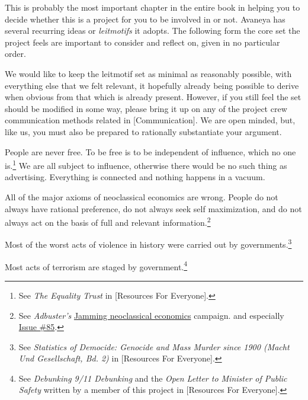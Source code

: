 

This is probably the most important chapter in the entire book in helping you to decide whether this is a project for you to be involved in or not. Avaneya has several recurring ideas or {\it leitmotifs} it adopts. The following form the core set the project feels are important to consider and reflect on, given in no particular order.

We would like to keep the leitmotif set as minimal as reasonably possible, with everything else that we felt relevant, it hopefully already being possible to derive when obvious from that which is already present. However, if you still feel the set should be modified in some way, please bring it up on any of the project crew communication methods related in [Communication]. We are open minded, but, like us, you must also be prepared to rationally substantiate your argument.

\startitemize[4]
\setupwhitespace[big]
\item
People are never free. To be free is to be independent of influence, which no one is.\footnote{See {\it The Equality Trust} in [Resources For Everyone].} We are all subject to influence, otherwise there would be no such thing as advertising. Everything is connected and nothing happens in a vacuum.

\item
All of the major axioms of neoclassical economics are wrong. People do not always have rational preference, do not always seek self maximization, and do not always act on the basis of full and relevant information.\footnote{See {\it Adbuster's} \href{http://anticap.wordpress.com/2010/10/25/jamming-neoclassical-economics/}{Jamming neoclassical economics} campaign. and especially \href{http://www.adbusters.org/cultureshop/backissues/85}{Issue \#85}.}

\item
Most of the worst acts of violence in history were carried out by governments.\footnote{See {\it Statistics of Democide: Genocide and Mass Murder since 1900 (Macht Und Gesellschaft, Bd. 2)} in [Resources For Everyone].}

\item
Most acts of terrorism are staged by government.\footnote{See {\it Debunking 9/11 Debunking} and the {\it Open Letter to Minister of Public Safety} written by a member of this project in [Resources For Everyone].}

